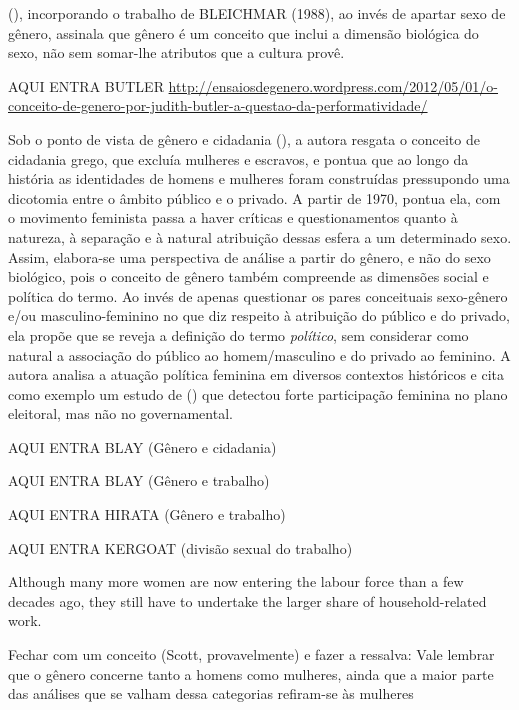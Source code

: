  (\citeyear{KEHL1998}), incorporando o trabalho de BLEICHMAR (1988), ao invés de apartar sexo de gênero, assinala que gênero é um conceito que inclui a dimensão biológica do sexo, não sem somar-lhe atributos que a cultura provê.

AQUI ENTRA BUTLER
\url{http://ensaiosdegenero.wordpress.com/2012/05/01/o-conceito-de-genero-por-judith-butler-a-questao-da-performatividade/}

Sob o ponto de vista de gênero e cidadania  (\citeyear{BRITO2001}), a autora resgata o conceito de cidadania grego, que excluía mulheres e escravos, e pontua que ao longo da história as identidades de homens e mulheres foram construídas pressupondo uma dicotomia entre o âmbito público e o privado. A partir de 1970, pontua ela, com o movimento feminista passa a haver críticas e questionamentos quanto à natureza, à separação e à natural atribuição dessas esfera a um determinado sexo. Assim, elabora-se uma perspectiva de análise a partir do gênero, e não do sexo biológico, pois o conceito de gênero também compreende as dimensões social e política do termo. Ao invés de apenas questionar os pares conceituais sexo-gênero e/ou masculino-feminino no que diz respeito à atribuição do público e do privado, ela propõe que se reveja a definição do termo \emph{político}, sem considerar como natural a associação do público ao homem/masculino e do privado ao feminino. A autora analisa a atuação política feminina em diversos contextos históricos e cita como exemplo um estudo de  (\citeyear{DUVERGER1955}) que detectou forte participação feminina no plano eleitoral, mas não no governamental.

AQUI ENTRA BLAY (Gênero e cidadania)

AQUI ENTRA BLAY (Gênero e trabalho)

AQUI ENTRA HIRATA (Gênero e trabalho)

AQUI ENTRA KERGOAT (divisão sexual do trabalho)


Although many more women are now entering the labour force than a few decades ago, they still have to undertake the larger share of household-related work.
\cite{BEST2005}


Fechar com um conceito (Scott, provavelmente) e fazer a ressalva:
Vale lembrar que o gênero concerne tanto a homens como mulheres, ainda que a maior parte das análises que se valham dessa categorias refiram-se às mulheres \cite{MORAES1998}








